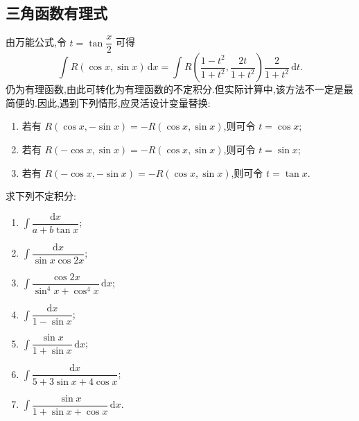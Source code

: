 \subsection{三角函数有理式}

\begin{proposition}[\markstar]
    由万能公式,令 $t=\tan\dfrac{x}{2}$ 可得
    \[
        \displaystyle\int R(\cos x,\sin x)\,\mathrm{d}x
        =\int R\left(\dfrac{1-t^2}{1+t^2},\dfrac{2t}{1+t^2}\right)
        \dfrac{2}{1+t^2}\,\mathrm{d}t.
    \]
    仍为有理函数,由此可转化为有理函数的不定积分.但实际计算中,该方法不一定是最简便的.因此,遇到下列情形,应灵活设计变量替换:
    \begin{enumerate}
        \item 若有 $R(\cos x,-\sin x)=-R(\cos x,\sin x)$,则可令 $t=\cos x$;
        \item 若有 $R(-\cos x,\sin x)=-R(\cos x,\sin x)$,则可令 $t=\sin x$;
        \item 若有 $R(-\cos x,-\sin x)=-R(\cos x,\sin x)$,则可令 $t=\tan x$.
    \end{enumerate}
\end{proposition}

\begin{example}
    求下列不定积分:
    \begin{enumerate}
        \item $\displaystyle\int\dfrac{\mathrm{d}x}{a+b\tan x}$;
        \item $\displaystyle\int\dfrac{\mathrm{d}x}{\sin x\cos2x}$;
        \item $\displaystyle\int\dfrac{\cos2x}{\sin^4x+\cos^4x}\,\mathrm{d}x$;
        \item $\displaystyle\int\dfrac{\mathrm{d}x}{1-\sin x}$;
        \item $\displaystyle\int\dfrac{\sin x}{1+\sin x}\,\mathrm{d}x$;
        \item $\displaystyle\int\dfrac{\mathrm{d}x}{5+3\sin x+4\cos x}$;
        \item $\displaystyle\int\dfrac{\sin x}{1+\sin x+\cos x}\,\mathrm{d}x$.
    \end{enumerate}
\end{example}
\exampleblank

